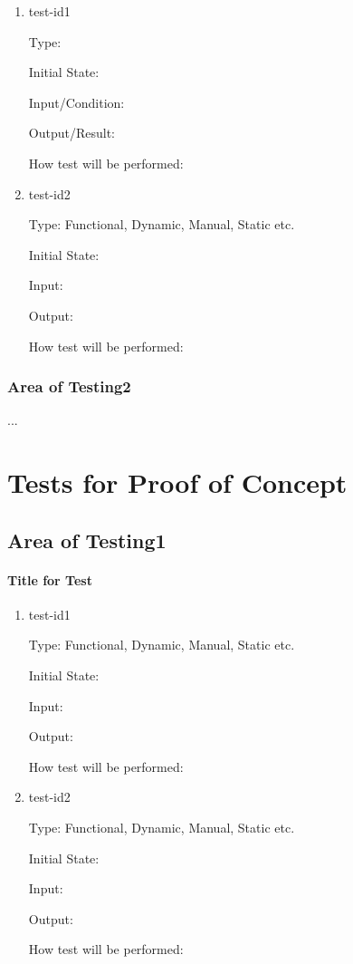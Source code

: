 \documentclass[12pt, titlepage]{article}
\begin{document}
\begin{enumerate}

\item{test-id1\\}

Type: 
					
Initial State: 
					
Input/Condition: 
					
Output/Result: 
					
How test will be performed: 
					
\item{test-id2\\}

Type: Functional, Dynamic, Manual, Static etc.
					
Initial State: 
					
Input: 
					
Output: 
					
How test will be performed: 

\end{enumerate}

\subsubsection{Area of Testing2}

...

\section{Tests for Proof of Concept}

\subsection{Area of Testing1}
		
\paragraph{Title for Test}

\begin{enumerate}

\item{test-id1\\}

Type: Functional, Dynamic, Manual, Static etc.
					
Initial State: 
					
Input: 
					
Output: 
					
How test will be performed: 
					
\item{test-id2\\}

Type: Functional, Dynamic, Manual, Static etc.
					
Initial State: 
					
Input: 
					
Output: 
					
How test will be performed: 

\end{enumerate}
\end{document}
